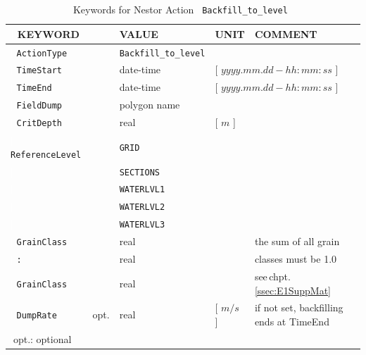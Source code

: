 \begin{table}[h]
\centering
\caption{Keywords for Nestor Action \texttt{~Backfill\_to\_level~}}
\begin{tabular}{| l | l | l | l | p{3.5cm} |}
\hline
{\textcolor{white}{\LARGE |}} \textbf{KEYWORD}        &     &\textbf{VALUE}         &\textbf{UNIT}          &\textbf{COMMENT}     \\ \hline
{\textcolor{white}{\LARGE |}} \texttt{ActionType}     &     &\texttt{Backfill\_to\_level}&                  &                     \\ \hline
{\textcolor{white}{\LARGE |}} \texttt{TimeStart}      &     &date-time              &\multicolumn{2}{l|}{[ $yyyy.mm.dd-hh:mm:ss$ ]} \\ \hline
{\textcolor{white}{\LARGE |}} \texttt{TimeEnd}        &     &date-time              &\multicolumn{2}{l|}{[ $yyyy.mm.dd-hh:mm:ss$ ]} \\ \hline
{\textcolor{white}{\LARGE |}} \texttt{FieldDump}      &     &polygon name           &                       &                     \\ \hline
{\textcolor{white}{\LARGE |}} \texttt{CritDepth}      &     &real                   &[ $m$ ]                &                     \\ \hline
{\textcolor{white}{\LARGE |}} \texttt{ReferenceLevel} &     &\texttt{GRID}          &                       &                     \\
{\textcolor{white}{\LARGE |}}                         &     &\texttt{SECTIONS}      &                       &                     \\
{\textcolor{white}{\LARGE |}}                         &     &\texttt{WATERLVL1}     &                       &                     \\
{\textcolor{white}{\LARGE |}}                         &     &\texttt{WATERLVL2}     &                       &                     \\
{\textcolor{white}{\LARGE |}}                         &     &\texttt{WATERLVL3}     &                       &                     \\ \hline
{\textcolor{white}{\LARGE |}} \texttt{GrainClass}     &     &real                   &                       &the sum of all grain \\
{\textcolor{white}{\LARGE |}} \texttt{:}              &     &real                   &                       &classes must be 1.0  \\
{\textcolor{white}{\LARGE |}} \texttt{GrainClass}     &     &real                   &                       &see\,chpt.\,\ref{ssec:E1SuppMat}\\ \hline
{\textcolor{white}{\LARGE |}} \texttt{DumpRate}       &opt. &real                   &[ $m/s$ ]              &if not set, backfilling ends at TimeEnd\\ \hline
\multicolumn{5}{|l|}{{\textcolor{white}{\LARGE |}}\small{opt.: optional}}                                                        \\ \hline
\end{tabular}
\end{table}

